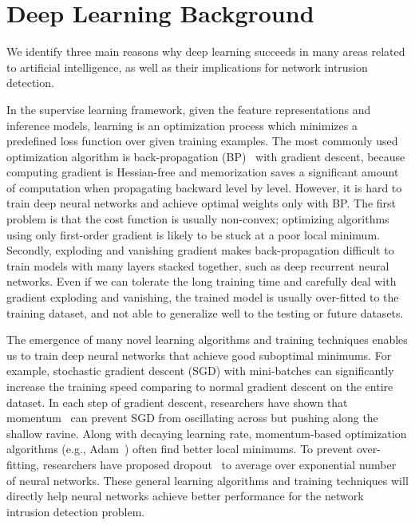 \section{Deep Learning Background}
We identify three main reasons why deep learning succeeds in many areas related
to artificial intelligence, as well as their implications for network intrusion detection.

In the supervise learning framework, given the feature representations and inference models,
learning is an optimization process which minimizes a predefined loss function
over given training examples.
The most commonly used optimization algorithm is back-propagation (BP)~\cite{Backpropagation} with gradient descent,
because computing gradient is Hessian-free and memorization saves a significant amount of computation when
propagating backward level by level.
However, it is hard to train deep neural networks and achieve optimal weights only with BP.
The first problem is that the cost function is usually non-convex;
optimizing algorithms using only first-order gradient is likely to be stuck at a poor local minimum.
Secondly, exploding and vanishing gradient makes back-propagation difficult to train models with many layers stacked together,
such as deep recurrent neural networks.
Even if we can tolerate the long training time and carefully deal with gradient exploding and vanishing,
the trained model is usually over-fitted to the training dataset, and not able to generalize well to the testing or future datasets.

The emergence of many novel learning algorithms and training techniques enables us to train deep
neural networks that achieve good suboptimal minimums.
For example, stochastic gradient descent (SGD) with mini-batches can significantly increase the training speed comparing
to normal gradient descent on the entire dataset.
In each step of gradient descent, researchers have shown that momentum~\cite{Momentum} can
prevent SGD from oscillating across but pushing along the shallow ravine.
Along with decaying learning rate, momentum-based optimization algorithms (e.g., Adam~\cite{Adam}) often find better local minimums.
To prevent over-fitting, researchers have proposed dropout~\cite{Dropout} to average over exponential number of neural networks.
These general learning algorithms and training techniques will directly help neural networks achieve
better performance for the network intrusion detection problem.

